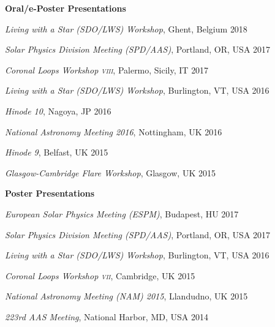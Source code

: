 \documentclass[11pt]{article}
\newcommand{\makeheading}[2][]%
        {\hspace*{-\marginparsep minus \marginparwidth}%
         \begin{minipage}[t]{\textwidth+\marginparwidth+\marginparsep}%
             {\large \bfseries #2 \hfill #1}\\[-0.15\baselineskip]%
                 \rule{\columnwidth}{1pt}%
         \end{minipage}}
\renewcommand{\section}[1]{\pagebreak[3]%
    \vspace{1.3\baselineskip}%
    \phantomsection\addcontentsline{toc}{section}{#1}%
    \noindent\llap{\scshape\smash{\parbox[t]{\marginparwidth}{\hyphenpenalty=10000\raggedright #1}}}%
    \vspace{-\baselineskip}\par}
\newcommand{\halfblankline}{\quad\vspace{-0.5\baselineskip}\pagebreak[3]}
\begin{document}
\textbf{Oral/e-Poster Presentations}
\begin{innerlist}
     \item[] \textit{Living with a Star (SDO/LWS) Workshop}, Ghent, Belgium \hfill {2018} %
     \item[] \textit{Solar Physics Division Meeting (SPD/AAS)}, Portland, OR, USA \hfill {2017} %
     \item[] \textit{Coronal Loops Workshop \textsc{viii}}, Palermo, Sicily, IT \hfill {2017} %
     \item[] \textit{Living with a Star (SDO/LWS) Workshop}, Burlington, VT, USA \hfill {2016} %
     \item[] \textit{Hinode 10}, Nagoya, JP \hfill {2016} %
     \item[] \textit{National Astronomy Meeting 2016}, Nottingham, UK \hfill {2016} %
     \item[] \textit{Hinode 9}, Belfast, UK \hfill {2015} %
%
%
%
     \item[] \textit{Glasgow-Cambridge Flare Workshop}, Glasgow, UK \hfill {2015} %
\end{innerlist}

\halfblankline

\textbf{Poster Presentations}
\begin{innerlist}
     \item[] \textit{European Solar Physics Meeting (ESPM)}, Budapest, HU \hfill {2017}
     \item[] \textit{Solar Physics Division Meeting (SPD/AAS)}, Portland, OR, USA \hfill {2017} %
     \item[] \textit{Living with a Star (SDO/LWS) Workshop}, Burlington, VT, USA \hfill {2016} %
     \item[] \textit{Coronal Loops Workshop \textsc{vii}}, Cambridge, UK \hfill {2015} %
     \item[] \textit{National Astronomy Meeting (NAM) 2015}, Llandudno, UK \hfill {2015} %
     \item[] \textit{223rd AAS Meeting}, National Harbor, MD, USA \hfill {2014} %
\end{innerlist}
\end{document}
